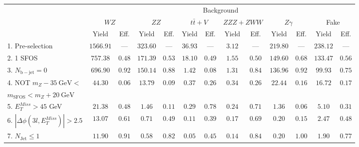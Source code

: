 \begin{tabular}{l||c|c||c|c||c|c||c|c||c|c||c|c}
\hline
 &       \multicolumn{12}{c}{Background}\\
 &  \multicolumn{2}{c||}{$WZ$} & \multicolumn{2}{c||}{$ZZ$} & \multicolumn{2}{c||}{$t\bar{t}+V$} & \multicolumn{2}{c||}{$ZZZ+ZWW$} & \multicolumn{2}{c||}{$Z\gamma$} & \multicolumn{2}{c||}{Fake} \\ 
 & Yield & Eff. & Yield & Eff. & Yield & Eff. & Yield & Eff. & Yield & Eff. & Yield & Eff. \\
\hline\hline
1. Pre-selection & $1566.91$ & --- &  $323.60$ & --- &  $36.93$ & --- &  $3.12$ & --- &  $219.80$ & --- &  $238.12$ & ---  \\
\hline
2. 1 SFOS &  $757.38$ &  $0.48$ &  $171.39$ &  $0.53$ &  $18.10$ &  $0.49$ &  $1.55$ &  $0.50$ &  $149.60$ &  $0.68$ &  $133.47$ &  $0.56$ \\ 
\hline
3. $N_{\mathrm{b-jet}} = 0$ &  $696.90$ &  $0.92$ &  $150.14$ &  $0.88$ &  $1.42$ &  $0.08$ &  $1.31$ &  $0.84$ &  $136.96$ &  $0.92$ &  $99.93$ &  $0.75$ \\ 
\hline
4. NOT $m_Z - 35~\mathrm{GeV} <$  &  \multirow{2}{*}{$44.30$} &  \multirow{2}{*}{$0.06$} &  \multirow{2}{*}{$13.79$} &  \multirow{2}{*}{$0.09$} &  \multirow{2}{*}{$0.37$} &  \multirow{2}{*}{$0.26$} &  \multirow{2}{*}{$0.34$} &  \multirow{2}{*}{$0.26$} &  \multirow{2}{*}{$22.44$} &  \multirow{2}{*}{$0.16$} &  \multirow{2}{*}{$16.72$} &  \multirow{2}{*}{$0.17$} \\ 
$ m_{\mathrm{SFOS}} < m_Z + 20~\mathrm{GeV}$ & & & & & & & & & & &  \\
\hline
5. $E_{T}^{Miss} > 45$ GeV &  $21.38$ &  $0.48$ &  $1.46$ &  $0.11$ &  $0.29$ &  $0.78$ &  $0.24$ &  $0.71$ &  $1.36$ &  $0.06$ &  $5.10$ &  $0.31$ \\ 
\hline
6. $|\Delta\phi(3l,E_{T}^{Miss})| > 2.5$ &  $13.07$ &  $0.61$ &  $0.71$ &  $0.49$ &  $0.11$ &  $0.39$ &  $0.17$ &  $0.69$ &  $0.20$ &  $0.15$ &  $2.47$ &  $0.48$ \\ 
\hline
7. $N_{\mathrm{Jet}} \leq 1$ &  $11.90$ &  $0.91$ &  $0.58$ &  $0.82$ &  $0.05$ &  $0.45$ &  $0.14$ &  $0.84$ &  $0.20$ &  $1.00$ &  $1.90$ &  $0.77$\\ 
\hline
\end{tabular}
